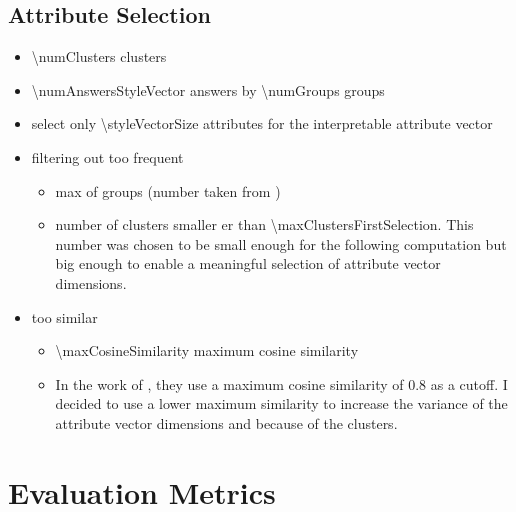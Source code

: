 \subsection{Attribute Selection}
\begin{itemize}
  \item \num{\numClusters} clusters
  \item \num{\numAnswersStyleVector} answers by \num{\numGroups} groups
  \item select only \num{\styleVectorSize} attributes for the interpretable attribute vector
  \item filtering out too frequent
        \begin{itemize}
          \item max \clusterMaxGroupRatio{} of groups (number taken from \citet{patelLearningInterpretableStyle2023})
          \item number of clusters smaller er than \num{\maxClustersFirstSelection}. This number was chosen to be small enough for the following computation but big enough to enable a meaningful selection of attribute vector dimensions.
        \end{itemize}
  \item too similar
        \begin{itemize}
          \item \num{\maxCosineSimilarity} maximum cosine similarity
          \item In the work of \citeauthor{patelLearningInterpretableStyle2023}, they use a maximum cosine similarity of \num{0.8} as a cutoff. I decided to use a lower maximum similarity to increase the variance of the attribute vector dimensions and because of the clusters. %
        \end{itemize}
\end{itemize}


\section{Evaluation Metrics}
\label{sec:approach:evaluationMetrics}

